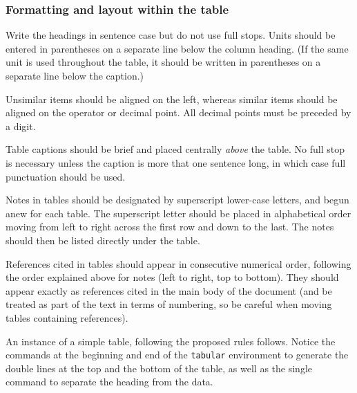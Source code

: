 \documentclass{cernrep}
\begin{document}
\subsubsection{Formatting and layout within the table}

Write the headings in sentence case but do not use full stops. Units
should be entered in parentheses on a separate line below the column
heading. (If the same unit is used throughout the table, it should be
written in parentheses on a separate line below the caption.)

Unsimilar items should be aligned on the left, whereas similar items
should be aligned on the operator or decimal point. All decimal points
must be preceded by a digit.


Table captions should be brief and placed centrally \emph{above} the
table. No full stop is necessary unless the caption is more that one
sentence long, in which case full punctuation should be used. 


Notes in tables should be designated by superscript lower-case
letters, and begun anew for each table. The superscript letter should
be placed in alphabetical order moving from left to right across the
first row and down to the last. The notes should then be listed
directly under the table.

References cited in tables should appear in consecutive numerical
order, following the order explained above for notes (left to right,
top to bottom).  They should appear exactly as references cited in the
main body of the document (and be treated as part of the text in terms
of numbering, so be careful when moving tables containing references).


An instance of a simple table, following the proposed rules follows.
Notice the  commands at the beginning and end of the
\texttt{tabular} environment to generate the double lines at the top
and the bottom of the table, as well as the single  command
to separate the heading from the data.
\end{document}

